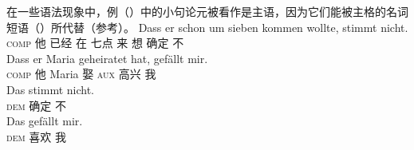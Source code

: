 \noindent
在一些语法现象中，例（）中的小句论元被看作是主语，因为它们能被主格的名词短语（）所代替（参考\citealp[, 289]{Eisenberg2004a}）。
\eal
\ex
\gll Dass er schon um sieben kommen wollte, stimmt nicht.\\
	 \textsc{comp} 他 已经 在 七点 来 想 确定 不\\
\ex 
\gll Dass er Maria geheiratet hat, gefällt mir.\\
	 \textsc{comp} 他 Maria 娶 \textsc{aux} 高兴 我\\
\zl
\eal
\ex
\gll Das stimmt nicht.\\
	 \textsc{dem} 确定 不\\
\ex 
\gll Das gefällt mir.\\
	  \textsc{dem} 喜欢 我\\
\zl
